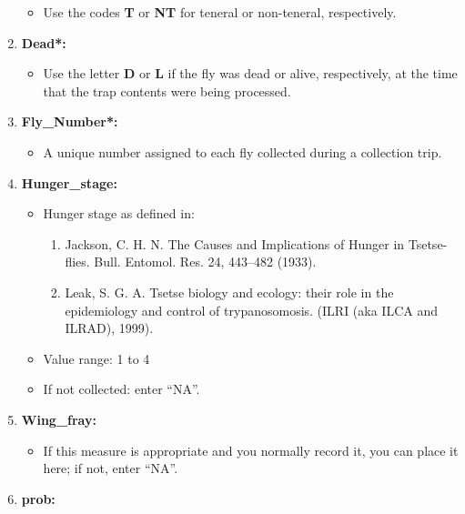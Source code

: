 \documentclass[letterpaper]{scrreprt}
\begin{document}
\begin{enumerate}
  \begin{itemize}
  \itemsep1pt\parskip0pt
  \item
    Use the codes \textbf{T} or \textbf{NT} for teneral or non-teneral,
    respectively.
  \end{itemize}
\item
  \textbf{Dead*:}

  \begin{itemize}
  \itemsep1pt\parskip0pt
  \item
    Use the letter \textbf{D} or \textbf{L} if the fly was dead or
    alive, respectively, at the time that the trap contents were being
    processed.
  \end{itemize}
\item
  \textbf{Fly\_Number*:}

  \begin{itemize}
  \itemsep1pt\parskip0pt
  \item
    A unique number assigned to each fly collected during a collection
    trip.
  \end{itemize}
\item
  \textbf{Hunger\_stage:}

  \begin{itemize}
  \item
    Hunger stage as defined in:

    \begin{enumerate}
    \def\labelenumii{\arabic{enumii}.}
    \itemsep1pt\parskip0pt
    \item
      Jackson, C. H. N. The Causes and Implications of Hunger in
      Tsetse-flies. Bull. Entomol. Res. 24, 443--482 (1933).
    \item
      Leak, S. G. A. Tsetse biology and ecology: their role in the
      epidemiology and control of trypanosomosis. (ILRI (aka ILCA and
      ILRAD), 1999).
    \end{enumerate}
  \item
    Value range: 1 to 4
  \item
    If not collected: enter ``NA''.
  \end{itemize}
\item
  \textbf{Wing\_fray:}

  \begin{itemize}
  \itemsep1pt\parskip0pt
  \item
    If this measure is appropriate and you normally record it, you can
    place it here; if not, enter ``NA''.
  \end{itemize}
\item
  \textbf{prob:}


\end{enumerate}
\end{document}
